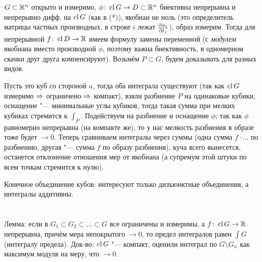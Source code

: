 \section{} %
$G \subset \mathbb{R}^n$ открыто и измеримо, $\phi \colon \operatorname{cl} G \to D \subset \mathbb{R}^n$ биективна непрерывна и непрерывно дифф. на $\operatorname{cl} G$ (как в (*)), якобиан не ноль
(это определитель матрицы частных производных, в строке $i$ лежат $\frac{\partial \phi_i}{\partial t_j}$), образ измерим.
Тогда для непрерывной $f \colon \operatorname{cl} D \to \mathbb{R}$ имеем формулу замены переменной (с \textit{модулем} якобиана вместо производной $\phi$, поэтому важна биективность, в одномерном скачки друг друга компенсируют).
Возьмём $P \subset G$, будем доказывать для разных видов.

Пусть это куб со стороной $a$, тогда оба интеграла существуют (так как $\operatorname{cl} G$ измеримо $\Rightarrow$ ограничено $\Rightarrow$ компакт), взяли разбиение $P$ на одинаковые кубики, оснащение "--- минимальные углы кубиков,
тогда такая сумма при мелких кубиках стремится к $\int_P$.
Подействуем на разбиение и оснащение $\phi$; так как $\phi$ равномерно непрерывна (на компакте же), то у нас мелкость разбиения в образе тоже будет $\to 0$.
Теперь сравниваем интегралы через суммы (одна сумма $f\cdot \dots$ по разбиению, другая "--- сумма $f$ по образу разбиения), куча всего вынесется,
останется отклонение отношения мер от якобиана (а супремум этой штуки по всем точкам стремится к нулю).

Конечное объединение кубов: интересуют только дизъюнктные объединения, а интегралы аддитивны.

\section{} %
Лемма: если в $G_1\subset G_2 \subset \dots \subset G$ все ограничены и измеримы, а $f \colon \operatorname{cl} G \to \mathbb{R}$ непрерывна, причём мера непокрытого $\to 0$, то предел интегралов равен $\int G$ (интегралу предела).
Док-во: $\operatorname{cl} G$ "--- компакт, оценили интеграл по $G \setminus G_n$ как максимум модуля на меру, что $\to 0$.

\TODO

\section{} %
\TODO

\section{} %
\TODO
